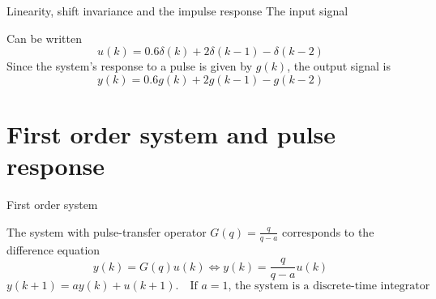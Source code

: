 \documentclass[presentation,aspectratio=1610]{beamer}
\begin{document}
\begin{frame}[label={sec:org1f189e0}]{Linearity, shift invariance and the impulse response}
The input signal
\begin{center}
\end{center}


Can be written 
\[u(k) = 0.6\delta(k) + 2\delta(k-1) - \delta(k-2) \]
Since the system's response to a pulse is given by \(g(k)\), the output signal is
\[ y(k) = 0.6g(k) + 2g(k-1) - g(k-2) \]
\end{frame}



\section{First order system and pulse response}
\label{sec:orgd7f28b7}

\begin{frame}[label={sec:orgdbeb0d2}]{First order system}
\begin{center}
\end{center}

The system with pulse-transfer operator \(G(q)=\frac{q}{q-a}\) corresponds to the difference equation
\[ y(k) = G(q)u(k) \Leftrightarrow y(k) = \frac{q}{q-a} u(k) \]
\[ y(k+1) = ay(k) + u(k+1). \quad \text{If $a=1$, the system is a discrete-time integrator}\]
\end{frame}
\end{document}

